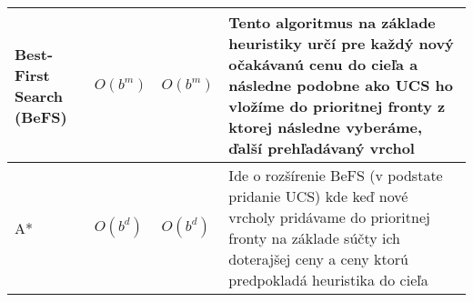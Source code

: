 \documentclass[a4paper]{article}
\begin{document}
\begin{table}[!h]
\begin{tabular}{|p{}|p{}|p{}|p{}|}
	Best-First Search (BeFS) & $O(b^m)$ & $O(b^m)$ & Tento algoritmus na základe heuristiky určí pre každý nový očakávanú cenu do cieľa a následne podobne ako UCS ho vložíme do prioritnej fronty z ktorej následne vyberáme, ďalší prehľadávaný vrchol \\ \hline
	A* & $O(b^d)$ & $O(b^d)$ & Ide o rozšírenie BeFS (v podstate pridanie UCS) kde keď nové vrcholy pridávame do prioritnej fronty na základe súčty ich doterajšej ceny a ceny ktorú predpokladá heuristika do cieľa \\ \hline
\end{tabular}
\end{table}
\end{document}
